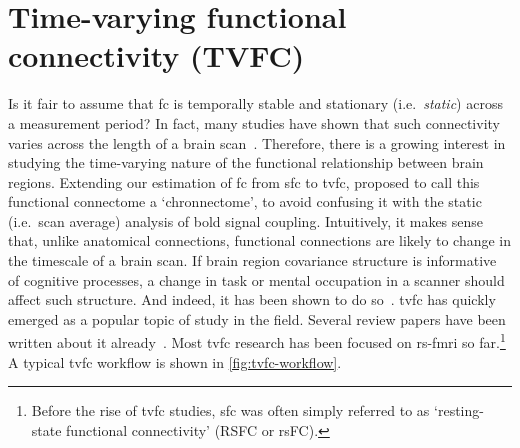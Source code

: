 \clearpage
\section{Time-varying functional connectivity (TVFC)}\label{sec:tvfc}

Is it fair to assume that \gls{fc} is temporally stable and stationary (i.e.~\emph{static}) across a measurement period?
In fact, many studies have shown that such connectivity varies across the length of a brain scan~\parencite{Chang2010, Sakoglu2010, Cribben2012, Lang2012, Hutchison2013, Hutchison2013b, Allen2014, Lindquist2014, Gonzalez-Castillo2015, Leonardi2015, Liegeois2017, Preti2017}.
Therefore, there is a growing interest in studying the time-varying nature of the functional relationship between brain regions.
Extending our estimation of \gls{fc} from \gls{sfc} to \gls{tvfc}, \textcite{Calhoun2014} proposed to call this functional connectome a `chronnectome', to avoid confusing it with the static (i.e.~scan average) analysis of \gls{bold} signal coupling.
%
Intuitively, it makes sense that, unlike anatomical connections, functional connections are likely to change in the timescale of a brain scan.
If brain region covariance structure is informative of cognitive processes, a change in task or mental occupation in a scanner should affect such structure.
And indeed, it has been shown to do so~\parencite{Doucet2012}.
%
\gls{tvfc} has quickly emerged as a popular topic of study in the field.
Several review papers have been written about it already~\parencite{Hutchison2013, Calhoun2014, Chen2017, Preti2017, Lurie2020}.
Most \gls{tvfc} research has been focused on \gls{rs-fmri} so far.\footnote{Before the rise of \gls{tvfc} studies, \gls{sfc} was often simply referred to as `resting-state functional connectivity' (RSFC or rsFC).}
A typical \gls{tvfc} workflow is shown in \cref{fig:tvfc-workflow}.


